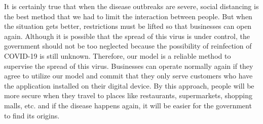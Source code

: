     \par It is certainly true that when the disease outbreaks are severe, social distancing is the best method that we had to limit the interaction between people. But when the situation gets better, restrictions must be lifted so that businesses can open again. Although it is possible that the spread of this virus is under control, the government should not be too neglected because the possibility of reinfection of COVID-19 is still unknown. Therefore, our model is a reliable method to supervise the spread of this virus. Businesses can operate normally again if they agree to utilize our model and commit that they only serve customers who have the application installed on their digital device. By this approach, people will be more secure when they travel to places like restaurants, supermarkets, shopping malls, etc. and if the disease happens again, it will be easier for the government to find its origins.
